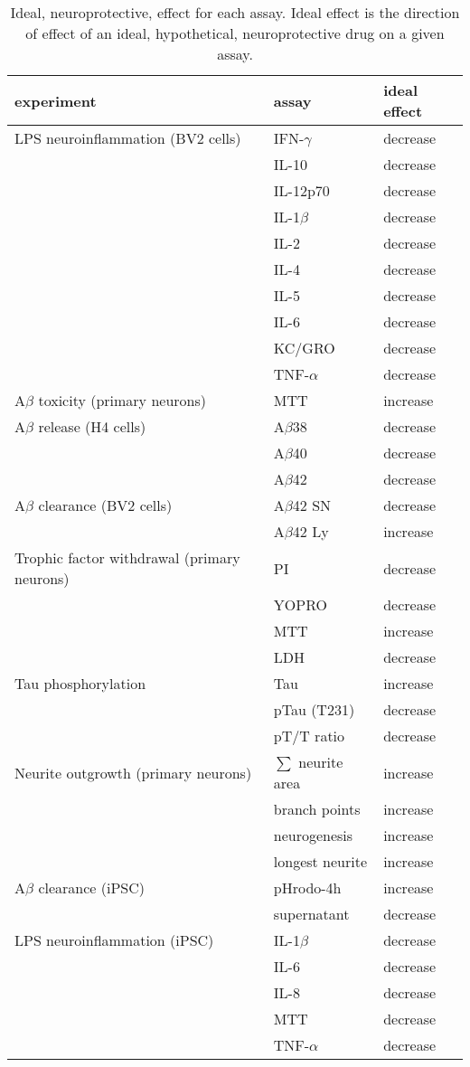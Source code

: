 \documentclass[letterpaper]{article}
\begin{document}
\begin{table}[p]
\begin{tabular}{lll}
\toprule
experiment & assay & ideal effect  \\
\midrule
LPS neuroinflammation (BV2 cells) & IFN-$\gamma$ & decrease \\
 & IL-10 & decrease \\
 & IL-12p70 & decrease \\
 & IL-1$\beta$ & decrease \\
 & IL-2 & decrease \\
 & IL-4 & decrease \\
 & IL-5 & decrease \\
 & IL-6 & decrease \\
 & KC/GRO & decrease \\
 & TNF-$\alpha$ & decrease \\
\cline{1-3}
A$\beta$ toxicity (primary neurons) & MTT & increase \\
\cline{1-3}
A$\beta$ release (H4 cells) & A$\beta$38 & decrease \\
 & A$\beta$40 & decrease \\
 & A$\beta$42 & decrease \\
\cline{1-3}
A$\beta$ clearance (BV2 cells) & A$\beta$42 SN & decrease \\
 & A$\beta$42 Ly & increase \\
\cline{1-3}
Trophic factor withdrawal (primary neurons) & PI & decrease \\
 & YOPRO & decrease \\
 & MTT & increase \\
 & LDH & decrease \\
\cline{1-3}
Tau phosphorylation & Tau & increase \\
 & pTau (T231) & decrease \\
 & pT/T ratio & decrease \\
\cline{1-3}
Neurite outgrowth (primary neurons) & $\sum$ neurite area & increase \\
 & branch points & increase \\
 & neurogenesis & increase \\
 & longest neurite & increase \\
\cline{1-3}
A$\beta$ clearance (iPSC) & pHrodo-4h & increase \\
 & supernatant & decrease \\
\cline{1-3}
LPS neuroinflammation (iPSC) & IL-1$\beta$ & decrease \\
 & IL-6 & decrease \\
 & IL-8 & decrease \\
 & MTT & decrease \\
 & TNF-$\alpha$ & decrease \\
\cline{1-3}
\bottomrule
\end{tabular}
\caption{
  Ideal, neuroprotective, effect for each assay.  Ideal effect is the
  direction of effect of an ideal, hypothetical, neuroprotective drug on a
  given assay.
}
\label{tab:protect-sign}
\end{table}
\end{document}
